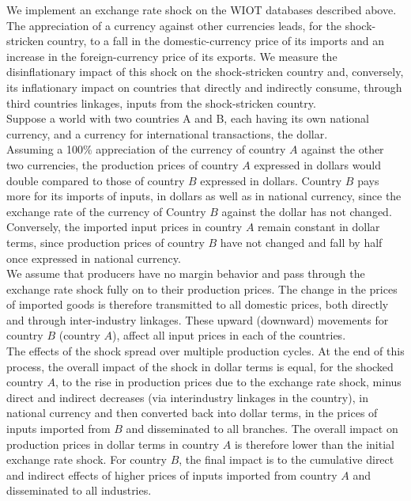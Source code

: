 \documentclass[11pt,a4paper]{article}
\begin{document}
We implement an exchange rate shock on the WIOT databases described above. 
The appreciation of a currency against other currencies leads, for the shock-stricken country, to a fall in the domestic-currency price of its imports and an increase in the foreign-currency price of its exports. We measure the disinflationary impact of this shock on the shock-stricken country and, conversely, its inflationary impact on countries that directly and indirectly consume, through third countries linkages, inputs from the shock-stricken country.\\
Suppose a world with two countries A and B, each having its own national currency, and a currency for international transactions, the dollar. \\
Assuming a 100$\%$ appreciation of the currency of country $A$ against the other two currencies, the production prices of country $A$ expressed in dollars would double compared to those of country $B$ expressed in dollars. Country $B$ pays more for its imports of inputs, in dollars as well as in national currency, since the exchange rate of the currency of Country $B$ against the dollar has not changed. Conversely, the imported input prices in country $A$ remain constant in dollar terms, since production prices of country $B$ have not changed and fall by half once expressed in national currency.\\
We assume that producers have no margin behavior and pass through the exchange rate shock fully on to their production prices. The change in the prices of imported goods is therefore transmitted to all domestic prices, both directly and through inter-industry linkages. These upward (downward) movements for country $B$ (country $A$), affect all input prices in each of the countries.\\
The effects of the shock spread over multiple production cycles. At the end of this process, the overall impact of the shock in dollar terms is equal, for the shocked country $A$, to the rise in production prices due to the exchange rate shock, minus direct and indirect decreases (via interindustry linkages in the country), in national currency and then converted back into dollar terms, in the prices of inputs imported from $B$ and disseminated to all branches. The overall impact on production prices in dollar terms in country $A$ is therefore lower than the initial exchange rate shock. For country $B$, the final impact is to the cumulative direct and indirect effects of higher prices of inputs imported from country $A$ and disseminated to all industries.\\
\end{document}
